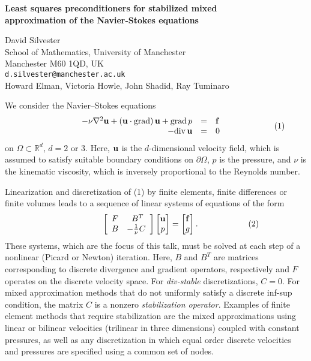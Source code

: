 \documentclass{report}
\begin{document}

\begin{center}
{\large
{\bf Least squares preconditioners for stabilized mixed \\
	approximation of the Navier-Stokes equations}}

	David Silvester \\
	School of Mathematics, University of Manchester \\
	Manchester M60 1QD, UK \\
	{\tt d.silvester@manchester.ac.uk} \\
	Howard Elman, Victoria Howle, John Shadid, Ray Tuminaro
\end{center}
We consider the Navier--Stokes equations
$$
\qquad
\qquad
\qquad
\begin{array}{rcl} -\nu \nabla^2 {\bf u} + ({\bf
u} \cdot {\rm grad})\, {\bf u} + {\rm grad}\, p &= &{\bf f}
\\ -{\rm div}\, {\bf u} &= &0 \end{array}
\qquad
\qquad
\qquad
(1)
$$
on
$\Omega \subset \mathbb{R}^d$, $d=2$ or $3$.
Here, ${\bf u}$
is the $d$-dimensional velocity field, which is assumed to
satisfy suitable boundary conditions on $\partial \Omega$,
$p$ is the pressure, and $\nu$ is the kinematic viscosity,
which is inversely proportional to the Reynolds number.

Linearization and discretization of (1) by finite
elements, finite differences or finite volumes leads to a
sequence of linear systems of equations of the form
$$
\qquad
\qquad
\qquad
\left[
\begin{array}{lc} F & \ B^T \\ B & -\frac{1}{\nu}C
\end{array} \right] \begin{bmatrix} {\bf u}\\ p
\end{bmatrix} = \begin{bmatrix} {\bf f}\\ g \end{bmatrix}.
\qquad
\qquad
\qquad
(2)
$$
These systems, which are the focus of this
talk, must be solved at each step of a nonlinear (Picard or
Newton) iteration. Here, $B$ and $B^T$ are matrices
corresponding to discrete divergence and gradient operators,
respectively and $F$ operates on the discrete velocity
space. For {\em div-stable} discretizations, $C=0$. For
mixed approximation methods that do not uniformly satisfy a
discrete inf-sup condition, the matrix $C$ is a nonzero {\em
stabilization operator}. Examples of finite element methods
that require stabilization are the mixed approximations
using linear or bilinear velocities (trilinear in
three dimensions) coupled with constant pressures, as well
as any discretization in which equal order discrete
velocities and pressures are specified using a common set of
nodes.
\end{document}
